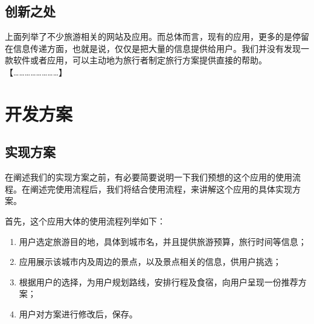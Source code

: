 \documentclass[12pt,a4paper]{article}
\begin{document}
\begin{CJK}{UTF8}{gbsn}
	\subsection{创新之处}
	上面列举了不少旅游相关的网站及应用。而总体而言，现有的应用，更多的是停留在信息传递方面，也就是说，仅仅是把大量的信息提供给用户。我们并没有发现一款软件或者应用，可以主动地为旅行者制定旅行方案提供直接的帮助。{\color{red} 【……………………】}


\clearpage
\section{开发方案}

	\subsection{实现方案}
	在阐述我们的实现方案之前，有必要简要说明一下我们预想的这个应用的使用流程。在阐述完使用流程后，我们将结合使用流程，来讲解这个应用的具体实现方案。

	首先，这个应用大体的使用流程列举如下：
	\begin{enumerate}
		\item
		用户选定旅游目的地，具体到城市名，并且提供旅游预算，旅行时间等信息；
		\item
		应用展示该城市内及周边的景点，以及景点相关的信息，供用户挑选；
		\item
		根据用户的选择，为用户规划路线，安排行程及食宿，向用户呈现一份推荐方案；
		\item
		用户对方案进行修改后，保存。
	\end{enumerate}
	

\end{CJK}
\end{document}
